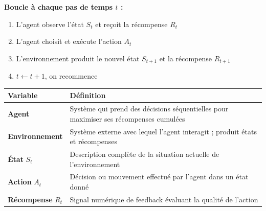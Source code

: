 \documentclass[11pt,a4paper]{article}
\begin{document}
\begin{formbox}
\begin{center}
\end{center}
\textbf{Boucle à chaque pas de temps $t$ :}
\begin{enumerate}[nosep]
\item L'agent observe l'état $S_t$ et reçoit la récompense $R_t$
\item L'agent choisit et exécute l'action $A_t$
\item L'environnement produit le nouvel état $S_{t+1}$ et la récompense $R_{t+1}$
\item $t \leftarrow t+1$, on recommence
\end{enumerate}
\end{formbox}

\begin{formbox}
\renewcommand{\arraystretch}{1.3}
\begin{tabular}{@{}l p{11cm}@{}}
\toprule
\textbf{Variable} & \textbf{Définition} \\
\midrule
\textbf{Agent} & Système qui prend des décisions séquentielles pour maximiser ses récompenses cumulées \\
\textbf{Environnement} & Système externe avec lequel l'agent interagit ; produit états et récompenses \\
\textbf{État} $S_t$ & Description complète de la situation actuelle de l'environnement \\
\textbf{Action} $A_t$ & Décision ou mouvement effectué par l'agent dans un état donné \\
\textbf{Récompense} $R_t$ & Signal numérique de feedback évaluant la qualité de l'action \\
\bottomrule
\end{tabular}
\end{formbox}
\end{document}
